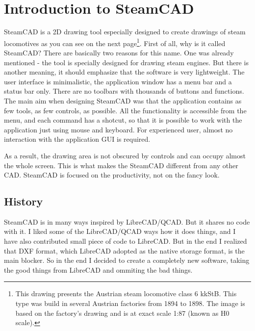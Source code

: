 \chapter{Introduction to SteamCAD}\label{chap:intro}

SteamCAD is a 2D drawing tool especially designed to create drawings of
steam locomotives as you can see on the next page\footnote{This drawing presents the
Austrian steam locomotive class 6 kkStB. This type was build in several Austrian
factories from 1894 to 1898. The image is based on the factory's drawing and is at
exact scale 1:87 (known as H0 scale).}. First of all, why is it called SteamCAD?
There are basically two reasons for this name. One was already mentioned - the tool is
specially designed for drawing steam engines. But there is another meaning, it should
emphasize that the software is very lightweight. The user interface is minimalistic,
the application window has a menu bar and a status bar only. There are no toolbars with
thousands of buttons and functions. The main aim when designing SteamCAD was that the
application contains as few tools, as few controls, as possible. All the functionality
is accessible from the menu, and each command has a shotcut, so that it is possible to
work with the application just using mouse and keyboard. For experienced user, almost
no interaction with the application GUI is required.

As a result, the drawing area is not obscured by controls and can occupy almost the whole
screen. This is what makes the SteamCAD different from any other CAD. SteamCAD is focused
on the productivity, not on the fancy look.

\section{History}

SteamCAD is in many ways inspired by LibreCAD/QCAD. But it shares no code with it. I liked
some of the LibreCAD/QCAD ways how it does things, and I have also contributed small piece
of code to LibreCAD. But in the end I realized that DXF format, which LibreCAD adopted as
the native storage format, is the main blocker. So in the end I decided to create a completely
new software, taking the good things from LibreCAD and ommiting the bad things.

